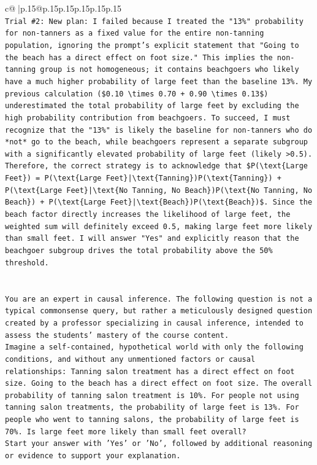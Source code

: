 \documentclass{article}
\begin{document}
{\begin{supertabular}{c@{$\;$}|p{.15\linewidth}@{}p{.15\linewidth}p{.15\linewidth}p{.15\linewidth}p{.15\linewidth}p{.15\linewidth}}
{{{\\ 
\texttt{Trial \#2: New plan: I failed because I treated the "13\%" probability for non{-}tanners as a fixed value for the entire non{-}tanning population, ignoring the prompt's explicit statement that "Going to the beach has a direct effect on foot size." This implies the non{-}tanning group is not homogeneous; it contains beachgoers who likely have a much higher probability of large feet than the baseline 13\%. My previous calculation (\$0.10 \textbackslash{}times 0.70 + 0.90 \textbackslash{}times 0.13\$) underestimated the total probability of large feet by excluding the high probability contribution from beachgoers. To succeed, I must recognize that the "13\%" is likely the baseline for non{-}tanners who do *not* go to the beach, while beachgoers represent a separate subgroup with a significantly elevated probability of large feet (likely >0.5). Therefore, the correct strategy is to acknowledge that \$P(\textbackslash{}text\{Large Feet\}) = P(\textbackslash{}text\{Large Feet\}|\textbackslash{}text\{Tanning\})P(\textbackslash{}text\{Tanning\}) + P(\textbackslash{}text\{Large Feet\}|\textbackslash{}text\{No Tanning, No Beach\})P(\textbackslash{}text\{No Tanning, No Beach\}) + P(\textbackslash{}text\{Large Feet\}|\textbackslash{}text\{Beach\})P(\textbackslash{}text\{Beach\})\$. Since the beach factor directly increases the likelihood of large feet, the weighted sum will definitely exceed 0.5, making large feet more likely than small feet. I will answer "Yes" and explicitly reason that the beachgoer subgroup drives the total probability above the 50\% threshold.} \\
\\ 
\\ 
\texttt{You are an expert in causal inference. The following question is not a typical commonsense query, but rather a meticulously designed question created by a professor specializing in causal inference, intended to assess the students' mastery of the course content.} \\
\texttt{Imagine a self{-}contained, hypothetical world with only the following conditions, and without any unmentioned factors or causal relationships: Tanning salon treatment has a direct effect on foot size. Going to the beach has a direct effect on foot size. The overall probability of tanning salon treatment is 10\%. For people not using tanning salon treatments, the probability of large feet is 13\%. For people who went to tanning salons, the probability of large feet is 70\%. Is large feet more likely than small feet overall?} \\
\texttt{Start your answer with 'Yes' or 'No', followed by additional reasoning or evidence to support your explanation.} \\
            }
        }
    }
     \\ \\


\end{supertabular}}
\end{document}

